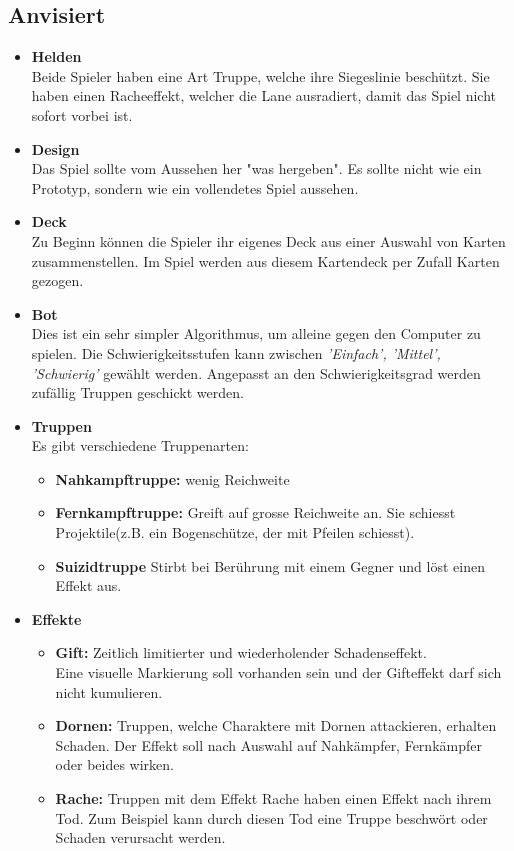 \subsection{Anvisiert}
\begin{itemize}
    \item \textbf{Helden} \\
        Beide Spieler haben eine Art Truppe, welche ihre Siegeslinie beschützt. Sie haben einen Racheeffekt, welcher die
        Lane ausradiert, damit das Spiel nicht sofort vorbei ist.
    \item \textbf{Design} \\
        Das Spiel sollte vom Aussehen her "was hergeben". Es sollte nicht wie ein Prototyp, sondern wie ein 
        vollendetes Spiel aussehen. 
    \item \textbf{Deck} \\
        Zu Beginn können die Spieler ihr eigenes Deck aus einer Auswahl von Karten zusammenstellen. Im Spiel werden aus diesem Kartendeck per Zufall Karten gezogen.
    \item \textbf{Bot} \\
        Dies ist ein sehr simpler Algorithmus, um alleine gegen den Computer zu spielen. Die Schwierigkeitsstufen kann zwischen \textit{'Einfach', 'Mittel', 'Schwierig'} gewählt werden.
        Angepasst an den Schwierigkeitsgrad werden zufällig Truppen geschickt werden.
    \item \textbf{Truppen}\\
    Es gibt verschiedene Truppenarten:
    \begin{itemize}
        \item \textbf{Nahkampftruppe:}
            wenig Reichweite
        \item \textbf{Fernkampftruppe:}
            Greift auf grosse Reichweite an. Sie schiesst Projektile(z.B. ein Bogenschütze, der mit Pfeilen schiesst).
        \item \textbf{Suizidtruppe}
            Stirbt bei Berührung mit einem Gegner und löst einen Effekt aus.
    \end{itemize}
    \item \textbf{Effekte}
    \begin{itemize}
        \item \textbf{Gift:}
            Zeitlich limitierter und wiederholender Schadenseffekt. \\Eine visuelle Markierung soll vorhanden sein
            und der Gifteffekt darf sich nicht kumulieren.
        \item \textbf{Dornen:}
            Truppen, welche Charaktere mit Dornen attackieren, erhalten Schaden. Der Effekt soll nach Auswahl auf Nahkämpfer,
            Fernkämpfer oder beides wirken.
        \item \textbf{Rache:}
            Truppen mit dem Effekt Rache haben einen Effekt nach ihrem Tod. Zum Beispiel kann durch diesen Tod eine Truppe beschwört oder Schaden verursacht werden.
    \end{itemize}
\end{itemize}

